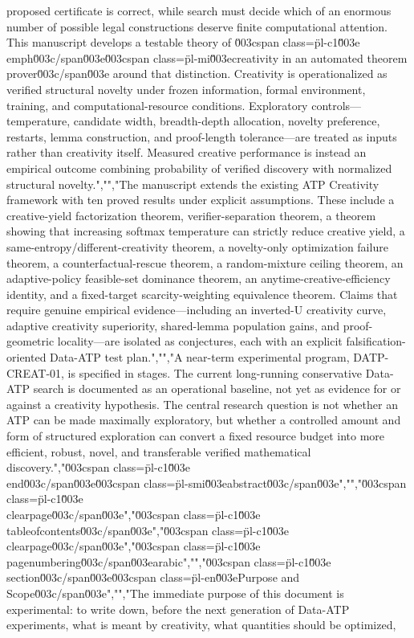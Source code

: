 {{{proposed certificate is correct, while search must decide which of an enormous number of possible legal constructions deserve finite computational attention. This manuscript develops a testable theory of \u003cspan class=\"pl-c1\"\u003e\\emph\u003c/span\u003e{\u003cspan class=\"pl-mi\"\u003ecreativity in an automated theorem prover\u003c/span\u003e} around that distinction. Creativity is operationalized as verified structural novelty under frozen information, formal environment, training, and computational-resource conditions. Exploratory controls---temperature, candidate width, breadth-depth allocation, novelty preference, restarts, lemma construction, and proof-length tolerance---are treated as inputs rather than creativity itself. Measured creative performance is instead an empirical outcome combining probability of verified discovery with normalized structural novelty.","","The manuscript extends the existing ATP Creativity framework with ten proved results under explicit assumptions. These include a creative-yield factorization theorem, verifier-separation theorem, a theorem showing that increasing softmax temperature can strictly reduce creative yield, a same-entropy/different-creativity theorem, a novelty-only optimization failure theorem, a counterfactual-rescue theorem, a random-mixture ceiling theorem, an adaptive-policy feasible-set dominance theorem, an anytime-creative-efficiency identity, and a fixed-target scarcity-weighting equivalence theorem. Claims that require genuine empirical evidence---including an inverted-U creativity curve, adaptive creativity superiority, shared-lemma population gains, and proof-geometric locality---are isolated as conjectures, each with an explicit falsification-oriented Data-ATP test plan.","","A near-term experimental program, DATP-CREAT-01, is specified in stages. The current long-running conservative Data-ATP search is documented as an operational baseline, not yet as evidence for or against a creativity hypothesis. The central research question is not whether an ATP can be made maximally exploratory, but whether a controlled amount and form of structured exploration can convert a fixed resource budget into more efficient, robust, novel, and transferable verified mathematical discovery.","\u003cspan class=\"pl-c1\"\u003e\\end\u003c/span\u003e{\u003cspan class=\"pl-smi\"\u003eabstract\u003c/span\u003e}","","\u003cspan class=\"pl-c1\"\u003e\\clearpage\u003c/span\u003e","\u003cspan class=\"pl-c1\"\u003e\\tableofcontents\u003c/span\u003e","\u003cspan class=\"pl-c1\"\u003e\\clearpage\u003c/span\u003e","\u003cspan class=\"pl-c1\"\u003e\\pagenumbering\u003c/span\u003e{arabic}","","\u003cspan class=\"pl-c1\"\u003e\\section\u003c/span\u003e{\u003cspan class=\"pl-en\"\u003ePurpose and Scope\u003c/span\u003e}","","The immediate purpose of this document is experimental: to write down, before the next generation of Data-ATP experiments, what is meant by creativity, what quantities should be optimized, }}}
